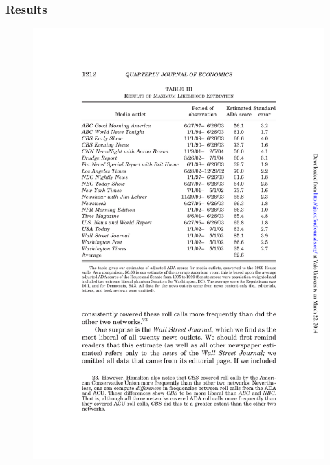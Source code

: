 \documentclass[english]{beamer}
\begin{document}
\begin{frame}
\frametitle{Results}
\begin{figure}
\begin{center}
\includegraphics [width=0.9\vsize]{Images/groseclose_milyio_table1.pdf}
\end{center}
\end{figure}
\end{frame}
\end{document}
